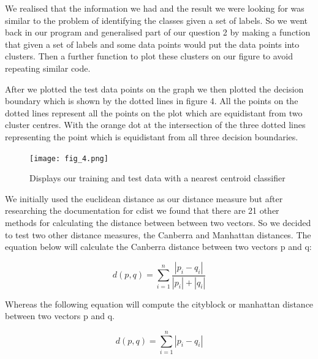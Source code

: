 \documentclass[A4Page,11pt]{article}
\begin{document}
We realised that the information we had and the result we were looking for was similar to the problem of identifying the classes given a set of labels. So we went back in our program and generalised part of our question 2 by making a function that given a set of labels and some data points would put the data points into clusters. Then a further function to plot these clusters on our figure to avoid repeating similar code.\par

After we plotted the test data points on the graph we then plotted the decision boundary which is shown by the dotted lines in figure 4. All the points on the dotted lines represent all the points on the plot which are equidistant from two cluster centres. With the orange dot at the intersection of the three dotted lines representing the point which is equidistant from all three decision boundaries. 
\begin{figure}[h!]
\centering
\texttt{[image: fig\_4.png]}
\caption{\label{fig 4:}Displays our training and test data with a nearest centroid classifier}
\end{figure}
We initially used the euclidean distance as our distance measure but after researching the documentation for cdist we found that there are 21 other methods for calculating the distance between between two vectors. So we decided to test two other distance measures, the Canberra and Manhattan distances. The equation below will calculate the Canberra distance between two vectors p and q:

\[d(p,q) = \sum_{i=1}^{n} \frac{|p_i - q_i|}{|p_i| + |q_i|}\]

Whereas the following equation will compute the cityblock or manhattan distance between two vectors p and q.

\[d(p,q) = \sum_{i=1}^{n} {|p_i - q_i|}\]
 

\end{document}

